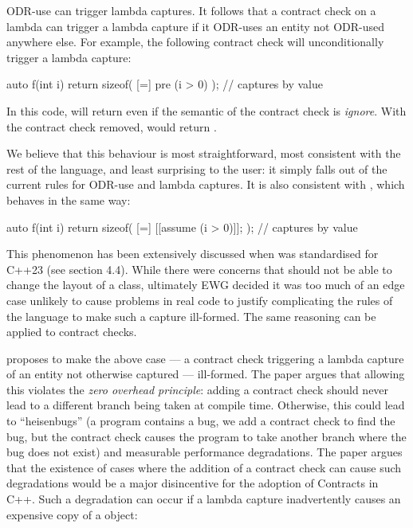 ODR-use can trigger lambda captures. It follows that a contract check on a lambda can trigger a lambda capture if it ODR-uses an entity not ODR-used anywhere else. For example, the following contract check will unconditionally trigger a lambda capture:

\begin{codeblock}
auto f(int i) {
  return sizeof( [=] pre (i > 0) {} );   // captures  by value
}
\end{codeblock}

In this code,  will return  even if the semantic of the contract check is \emph{ignore}. With the contract check removed,  would return .

We believe that this behaviour is most straightforward, most consistent with the rest of the language, and least surprising to the user: it simply falls out of the current rules for ODR-use and lambda captures. It is also consistent with \tcode{[[assume]]}, which behaves in the same way:

\begin{codeblock}
auto f(int i) {
  return sizeof( [=] { [[assume (i > 0)]]; } );   // captures  by value
}
\end{codeblock}

This phenomenon has been extensively discussed when \tcode{[[assume]]} was standardised for C++23 (see \cite{P1774R8} section 4.4). While there were concerns that \tcode{[[assume]]} should not be able to change the layout of a class, ultimately EWG decided it was too much of an edge case unlikely to cause problems in real code to justify complicating the rules of the language to make such a capture ill-formed. The same reasoning can be applied to contract checks.

\cite{P2932R1} proposes to make the above case --- a contract check triggering a lambda capture of an entity not otherwise captured --- ill-formed. The paper argues that allowing this violates the \emph{zero overhead principle}: adding a contract check should never lead to a different branch being taken at compile time. Otherwise, this could lead to ``heisenbugs'' (a program contains a bug, we add a contract check to find the bug, but the contract check causes the program to take another branch where the bug does not exist) and measurable performance degradations. The paper argues that the existence of cases where the addition of a contract check can cause such degradations would be a major disincentive for the adoption of Contracts in C++. Such a degradation can occur if a lambda capture inadvertently causes an expensive copy of a object:

